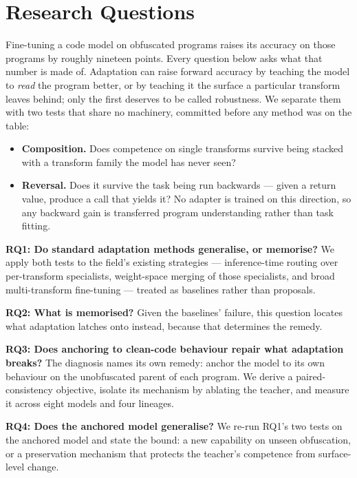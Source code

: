 \section{Research Questions}
\label{sec:rqs}

Fine-tuning a code model on obfuscated programs raises its accuracy on those programs by roughly
nineteen points. Every question below asks what that number is made of. Adaptation can raise forward
accuracy by teaching the model to \emph{read} the program better, or by teaching it the surface a
particular transform leaves behind; only the first deserves to be called robustness. We separate them
with two tests that share no machinery, committed before any method was on the table:
\begin{itemize}[leftmargin=*, topsep=2pt, itemsep=1pt]
  \item \textbf{Composition.} Does competence on single transforms survive being stacked with a
        transform family the model has never seen?
  \item \textbf{Reversal.} Does it survive the task being run backwards --- given a return value,
        produce a call that yields it? No adapter is trained on this direction, so any backward gain
        is transferred program understanding rather than task fitting.
\end{itemize}

\noindent\textbf{RQ1: Do standard adaptation methods generalise, or memorise?} We apply both tests to
the field's existing strategies --- inference-time routing over per-transform specialists,
weight-space merging of those specialists, and broad multi-transform fine-tuning --- treated as
baselines rather than proposals.

\noindent\textbf{RQ2: What is memorised?} Given the baselines' failure, this question locates what
adaptation latches onto instead, because that determines the remedy.

\noindent\textbf{RQ3: Does anchoring to clean-code behaviour repair what adaptation breaks?} The
diagnosis names its own remedy: anchor the model to its own behaviour on the unobfuscated parent of
each program. We derive a paired-consistency objective, isolate its mechanism by ablating the
teacher, and measure it across eight models and four lineages.

\noindent\textbf{RQ4: Does the anchored model generalise?} We re-run RQ1's two tests on the anchored
model and state the bound: a new capability on unseen obfuscation, or a preservation mechanism that
protects the teacher's competence from surface-level change.
